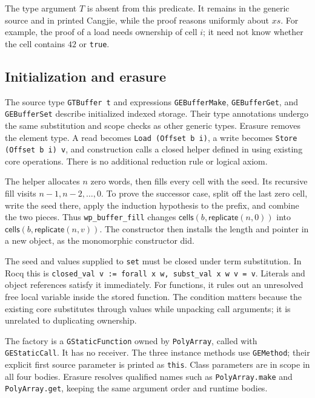 The type argument $T$ is absent from this predicate. It remains in the
generic source and in printed Cangjie, while the proof reasons uniformly
about $xs$. For example, the proof of a load needs ownership of cell $i$;
it need not know whether the cell contains $42$ or \texttt{true}.

\subsection{Initialization and erasure}

The source type \texttt{GTBuffer t} and expressions
\texttt{GEBufferMake}, \texttt{GEBufferGet}, and \texttt{GEBufferSet}
describe initialized indexed storage. Their type annotations undergo the
same substitution and scope checks as other generic types. Erasure removes
the element type. A read becomes \texttt{Load (Offset b i)}, a write
becomes \texttt{Store (Offset b i) v}, and construction calls a closed
helper defined in  using existing core operations.
There is no additional reduction rule or logical axiom.

The helper allocates $n$ zero words, then fills every cell with the seed.
Its recursive fill visits $n-1,n-2,\ldots,0$. To prove the successor case,
split off the last zero cell, write the seed there, apply the induction
hypothesis to the prefix, and combine the two pieces. Thus
\texttt{wp\_buffer\_fill} changes
$\mathsf{cells}(b,\mathsf{replicate}(n,0))$ into
$\mathsf{cells}(b,\mathsf{replicate}(n,v))$.
The constructor then installs the length and pointer in a new object,
as the monomorphic constructor did.

The seed and values supplied to \texttt{set} must be closed under
term substitution. In Rocq this is
\texttt{closed\_val v := forall x w, subst\_val x w v = v}.
Literals and object references satisfy it immediately. For functions, it
rules out an unresolved free local variable inside the stored function.
The condition matters because the existing core substitutes through values
while unpacking call arguments; it is unrelated to duplicating ownership.

The factory is a \texttt{GStaticFunction} owned by \texttt{PolyArray},
called with \texttt{GEStaticCall}. It has no receiver. The three instance
methods use \texttt{GEMethod}; their explicit first source parameter is
printed as \texttt{this}. Class parameters are in scope in all four bodies.
Erasure resolves qualified names such as \texttt{PolyArray.make} and
\texttt{PolyArray.get}, keeping the same argument order and runtime bodies.

